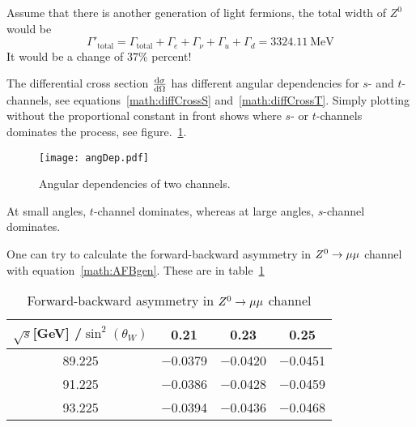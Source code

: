 Assume that there is another generation of light fermions, the total width of $Z^0$ would be
\begin{equation}
	\Gamma'_\text{total} = \Gamma_\text{total} + \Gamma_e + \Gamma_\nu + \Gamma_u + \Gamma_d = \SI{3324.11}{\mega\eV}
\end{equation}
It would be a change of $37 \%$ percent!

The differential cross section $\dv{\sigma}{\Omega}$ has different angular dependencies for $s$- and $t$-channels, see equations~\ref{math:diffCrossS} and~\ref{math:diffCrossT}. Simply plotting without the proportional constant in front shows where $s$- or $t$-channels dominates the process, see figure.~\ref{fig:angDep}.
\begin{figure}[ht]
	\centering
	\texttt{[image: angDep.pdf]}
	\caption{Angular dependencies of two channels.}%
	\label{fig:angDep}
\end{figure}
At small angles, $t$-channel dominates, whereas at large angles, $s$-channel dominates.

One can try to calculate the forward-backward asymmetry in $ Z^0 \rightarrow \mu\mu$ channel with equation~\ref{math:AFBgen}. These are in table~\ref{tab:fbAsymm_theo}	
\begin{table}[htpb]
	\centering
\begin{tabular}{c|ccc}
	\toprule
	$\sqrt{s}$[\si{\giga\eV}] /$\sin^2(\theta_W)$ & \num{0.21} & \num{0.23} & \num{0.25} \\
	\midrule
	\num{89.225} & \num{-0.0379} & \num{-0.0420} & \num{-0.0451} \\
	\num{91.225} & \num{-0.0386} & \num{-0.0428} & \num{-0.0459} \\
	\num{93.225} & \num{-0.0394} & \num{-0.0436} & \num{-0.0468} \\
	\bottomrule
\end{tabular}
\caption{Forward-backward asymmetry in $Z^0\rightarrow \mu\mu$ channel}
\label{tab:fbAsymm_theo}
\end{table}

